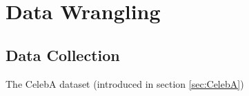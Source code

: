 \section{Data Wrangling}

\subsection{Data Collection}

The CelebA dataset (introduced in section \ref{sec:CelebA})
